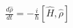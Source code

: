 \documentclass[preview]{standalone}
\begin{document}
\begin{align*}
\frac{d\hat{\rho}}{dt} = -\frac{i}{\hbar}[\hat{H}, \hat{\rho}]
\end{align*}
\end{document}
